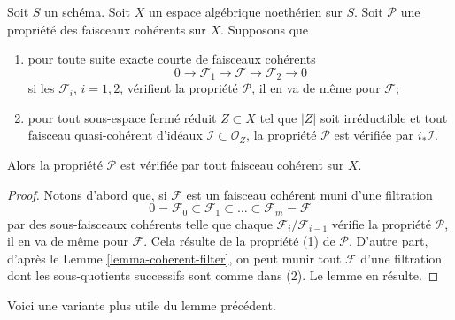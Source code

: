 \begin{lemma}
\label{lemma-property-initial}
Soit $S$ un schéma. Soit $X$ un espace algébrique noethérien sur $S$.
Soit $\mathcal{P}$ une propriété des faisceaux cohérents sur $X$. Supposons que
\begin{enumerate}
\item pour toute suite exacte courte de faisceaux cohérents
$$
0 \to \mathcal{F}_1 \to \mathcal{F} \to \mathcal{F}_2 \to 0
$$
si les $\mathcal{F}_i$, $i = 1, 2$, vérifient la propriété $\mathcal{P}$,
il en va de même pour $\mathcal{F}$;
\item pour tout sous-espace fermé réduit $Z \subset X$ tel que $|Z|$ soit irréductible
et tout faisceau quasi-cohérent d'idéaux $\mathcal{I} \subset \mathcal{O}_Z$,
la propriété $\mathcal{P}$ est vérifiée par $i_*\mathcal{I}$.
\end{enumerate}
Alors la propriété $\mathcal{P}$ est vérifiée par tout faisceau cohérent sur $X$.
\end{lemma}

\begin{proof}
Notons d'abord que, si $\mathcal{F}$ est un faisceau cohérent muni d'une filtration
$$
0 = \mathcal{F}_0 \subset \mathcal{F}_1 \subset
\ldots \subset \mathcal{F}_m = \mathcal{F}
$$
par des sous-faisceaux cohérents telle que chaque $\mathcal{F}_i/\mathcal{F}_{i - 1}$
vérifie la propriété $\mathcal{P}$, il en va de même pour $\mathcal{F}$.
Cela résulte de la propriété (1) de $\mathcal{P}$.
D'autre part, d'après le Lemme \ref{lemma-coherent-filter},
on peut munir tout $\mathcal{F}$ d'une filtration
dont les sous-quotients successifs sont comme dans (2).
Le lemme en résulte.
\end{proof}

\noindent
Voici une variante plus utile du lemme précédent.

